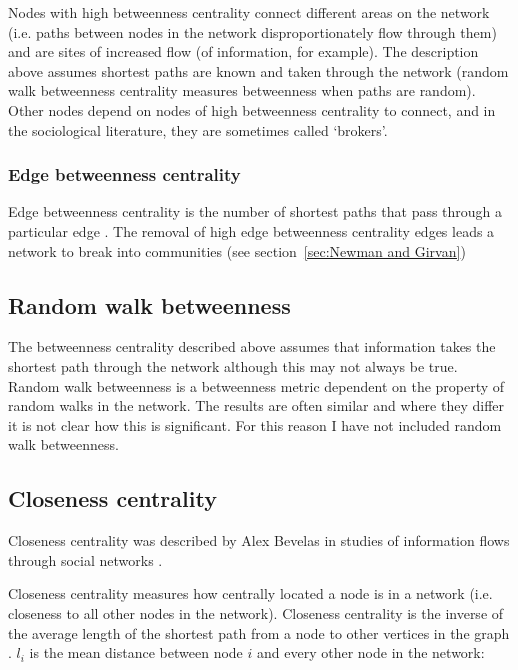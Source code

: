 Nodes with high betweenness centrality connect different areas on the network (i.e. paths between nodes in the network disproportionately flow through them) and are sites of increased flow (of information, for example). The description above assumes shortest paths are known and taken through the network\cite{borgatti2005centrality}  (random walk betweenness centrality measures betweenness when paths are random). Other nodes depend on nodes of high betweenness centrality to connect, and in the sociological literature, they are sometimes called  `brokers'\cite{newman2018networks}. 



\subsubsection{Edge betweenness centrality}
 Edge betweenness centrality is the number of shortest paths that pass through a particular edge \cite{girvan2002community}. The removal of high edge betweenness centrality edges leads a network to break into communities (see section~\ref{sec:Newman and Girvan})

\subsection{Random walk betweenness}
\label{sec: random walk betweenness}
The betweenness centrality described above assumes that information takes the shortest path through the network although this may not always be true. Random walk betweenness is a betweenness metric dependent on the property of random walks in the network. The results are often similar and where they differ it is not clear how this is significant\cite{newman2018networks}. For this reason I have not included random walk betweenness. 

\subsection{Closeness centrality}
\label{sec:closenesscentrality}
Closeness centrality was described by Alex Bevelas in studies of information flows through social networks \cite{bavelas1948mathematical}. 

Closeness centrality measures how centrally located a node is in a network (i.e. closeness to all other nodes in the network). Closeness centrality is the inverse of the average length of the shortest path from a node to other vertices in the graph \cite{freeman1978centrality}. $l_i$ is the mean distance between node $i$ and every other node in the network:

